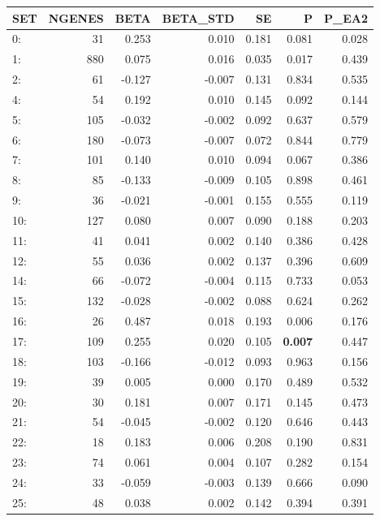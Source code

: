 \begin{table}[ht]
\centering
\begin{tabular}{lrrrrrr}
  \hline
SET & NGENES & BETA & BETA\_STD & SE & P & P\_EA2 \\ 
  \hline
0: &   31 & 0.253 & 0.010 & 0.181 & 0.081 & 0.028 \\ 
  1: &  880 & 0.075 & 0.016 & 0.035 & 0.017 & 0.439 \\ 
  2: &   61 & -0.127 & -0.007 & 0.131 & 0.834 & 0.535 \\ 
  4: &   54 & 0.192 & 0.010 & 0.145 & 0.092 & 0.144 \\ 
  5: &  105 & -0.032 & -0.002 & 0.092 & 0.637 & 0.579 \\ 
  6: &  180 & -0.073 & -0.007 & 0.072 & 0.844 & 0.779 \\ 
  7: &  101 & 0.140 & 0.010 & 0.094 & 0.067 & 0.386 \\ 
  8: &   85 & -0.133 & -0.009 & 0.105 & 0.898 & 0.461 \\ 
  9: &   36 & -0.021 & -0.001 & 0.155 & 0.555 & 0.119 \\ 
  10: &  127 & 0.080 & 0.007 & 0.090 & 0.188 & 0.203 \\ 
  11: &   41 & 0.041 & 0.002 & 0.140 & 0.386 & 0.428 \\ 
  12: &   55 & 0.036 & 0.002 & 0.137 & 0.396 & 0.609 \\ 
  14: &   66 & -0.072 & -0.004 & 0.115 & 0.733 & 0.053 \\ 
  15: &  132 & -0.028 & -0.002 & 0.088 & 0.624 & 0.262 \\ 
  16: &   26 & 0.487 & 0.018 & 0.193 & 0.006 & 0.176 \\ 
  17: &  109 & 0.255 & 0.020 & 0.105 & \textbf{0.007} & 0.447 \\ 
  18: &  103 & -0.166 & -0.012 & 0.093 & 0.963 & 0.156 \\ 
  19: &   39 & 0.005 & 0.000 & 0.170 & 0.489 & 0.532 \\ 
  20: &   30 & 0.181 & 0.007 & 0.171 & 0.145 & 0.473 \\ 
  21: &   54 & -0.045 & -0.002 & 0.120 & 0.646 & 0.443 \\ 
  22: &   18 & 0.183 & 0.006 & 0.208 & 0.190 & 0.831 \\ 
  23: &   74 & 0.061 & 0.004 & 0.107 & 0.282 & 0.154 \\ 
  24: &   33 & -0.059 & -0.003 & 0.139 & 0.666 & 0.090 \\ 
  25: &   48 & 0.038 & 0.002 & 0.142 & 0.394 & 0.391 \\ 

\end{tabular}
\end{table}
